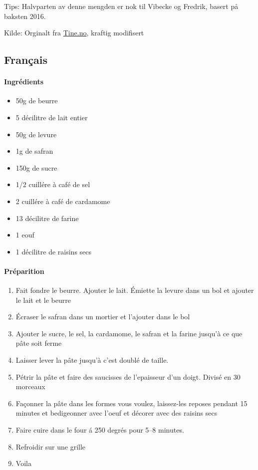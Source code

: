 \documentclass[12pt,a4paper]{book}
\begin{document}
{Tips: Halvparten av denne mengden er nok til Vibecke og Fredrik, basert på baksten 2016.

Kilde: Orginalt fra \href{http://www.tine.no/oppskrifter/bakst/sot-gjarbakst/lussekatter}{Tine.no}, kraftig modifisert


\subsection{Français}
\paragraph{Ingrédients}
\begin{itemize}[noitemsep]
	\item 50g de beurre
	\item 5 décilitre de lait entier
	\item 50g de levure
	\item 1g de safran
	\item 150g de sucre
	\item 1/2 cuillére à café de sel
	\item 2 cuillére à café de cardamome
	\item 13 décilitre de farine
	\item 1 eouf
	\item 1 décilitre de raisins secs
\end{itemize}

\paragraph{Préparition}
\begin{enumerate}[noitemsep]
	\item Fait fondre le beurre. Ajouter le lait. Émiette la levure dans un bol et ajouter le lait et le beurre
	\item Écraser le safran dans un mortier et l'ajouter  dans le bol
	\item Ajouter le sucre, le sel, la cardamome, le safran et la farine jusqu'à ce que pâte soit ferme
	\item Laisser lever la pâte jusqu'à c'est doublé de taille.
	\item Pétrir la pâte et faire des saucisses de l'epaisseur d'un doigt. Divisé en 30 morceaux
	\item Façonner la pâte dans les formes vous voulez, laissez-les reposes pendant 15 minutes et bedigeonner avec l'oeuf et décorer avec des raisins secs
	\item Faire cuire dans le four á 250 degrés pour 5--8 minutes.
	\item Refroidir sur une grille
	\item Voila
\end{enumerate}


}
\end{document}
